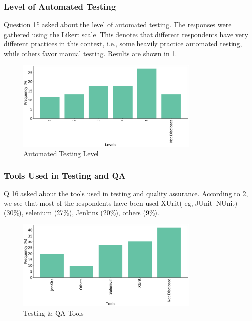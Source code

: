 \subsubsection{Level of Automated Testing}
Question 15 asked about the level of automated testing. The responses were gathered using the Likert scale. This denotes that different respondents have very different practices in this context, i.e., some heavily practice automated testing, while others favor manual testing. Results are shown in \ref{fig:autoTest}.
\begin{figure}[htbp]
\centering
  \includegraphics[width=0.8\textwidth]{Figures/Respondents_autotest_level}
  \caption{Automated Testing Level}
  \label{fig:autoTest}
\end{figure}

\subsubsection{Tools Used in Testing and QA}
Q 16 asked about the tools used in testing and quality assurance. According to \ref{fig:testingTools}, we see that most of the respondents have been used XUnit( eg, JUnit, NUnit) (30\%), selenium (27\%), Jenkins (20\%), others (9\%). 
\begin{figure}[htbp]
\centering
  \includegraphics[width=0.8\textwidth]{Figures/Respondents_testing_tools}
  \caption{Testing \& QA Tools}
  \label{fig:testingTools}
\end{figure}

